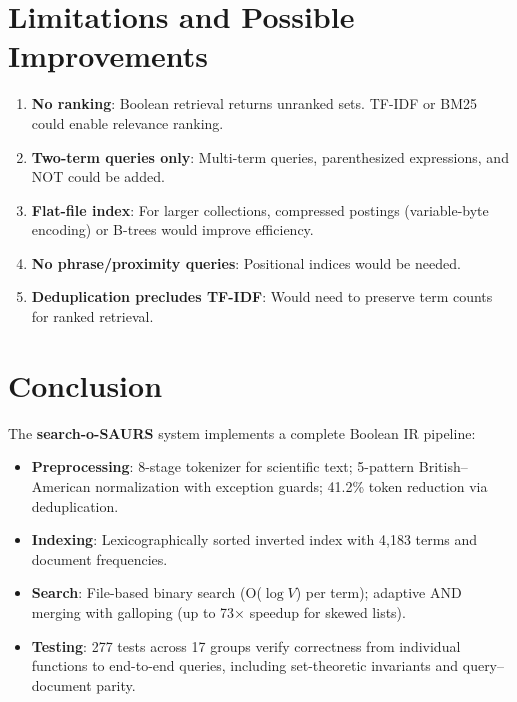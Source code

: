 \documentclass[12pt,a4paper]{article}
\begin{document}
\section{Limitations and Possible Improvements}
\label{sec:limitations}

\begin{enumerate}[noitemsep]
  \item \textbf{No ranking}: Boolean retrieval returns unranked sets. TF-IDF or BM25 could enable relevance ranking.
  \item \textbf{Two-term queries only}: Multi-term queries, parenthesized expressions, and NOT could be added.
  \item \textbf{Flat-file index}: For larger collections, compressed postings (variable-byte encoding) or B-trees would improve efficiency.
  \item \textbf{No phrase/proximity queries}: Positional indices would be needed.
  \item \textbf{Deduplication precludes TF-IDF}: Would need to preserve term counts for ranked retrieval.
\end{enumerate}

\section{Conclusion}
\label{sec:conclusion}

The \textbf{search-o-SAURS} system implements a complete Boolean IR pipeline:

\begin{itemize}[noitemsep]
  \item \textbf{Preprocessing}: 8-stage tokenizer for scientific text;
        5-pattern British--American normalization with exception guards;
        41.2\% token reduction via deduplication.
  \item \textbf{Indexing}: Lexicographically sorted inverted index with 4,183
        terms and document frequencies.
  \item \textbf{Search}: File-based binary search (O($\log V$) per term);
        adaptive AND merging with galloping (up to 73$\times$ speedup for
        skewed lists).
  \item \textbf{Testing}: 277 tests across 17 groups verify correctness from
        individual functions to end-to-end queries, including set-theoretic
        invariants and query--document parity.
\end{itemize}
\end{document}
